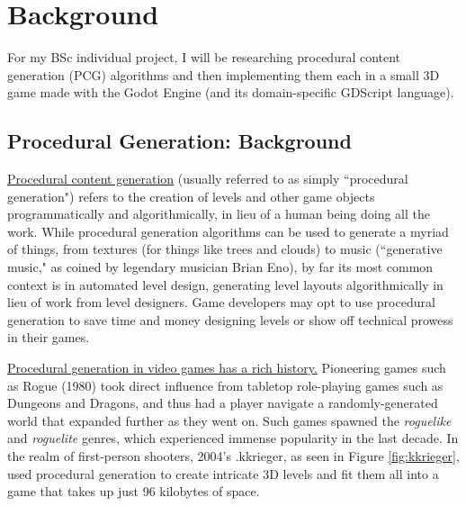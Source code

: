 \chapter{Background}

For my BSc individual project, I will be researching procedural content generation (PCG) algorithms and then implementing them each in a small 3D game made with the Godot Engine (and its domain-specific GDScript language).

\section{Procedural Generation: Background}

\href{https://en.wikipedia.org/wiki/Procedural_generation}{Procedural content generation} (usually referred to as simply ``procedural generation") refers to the creation of levels and other game objects programmatically and algorithmically, in lieu of a human being doing all the work. While procedural generation algorithms can be used to generate a myriad of things, from textures (for things like trees and clouds) to music (``generative music," as coined by legendary musician Brian Eno), by far its most common context is in automated level design, generating level layouts algorithmically in lieu of work from level designers. Game developers may opt to use procedural generation to save time and money designing levels or show off technical prowess in their games.

\href{https://en.wikipedia.org/wiki/Procedural\_generation#Video\_games}{Procedural generation in video games has a rich history.} Pioneering games such as Rogue (1980) took direct influence from tabletop role-playing games such as Dungeons and Dragons, and thus had a player navigate a randomly-generated world that expanded further as they went on. Such games spawned the \emph{roguelike} and \emph{roguelite} genres, which experienced immense popularity in the last decade. In the realm of first-person shooters, 2004's .kkrieger, as seen in Figure \ref{fig:kkrieger}, used procedural generation to create intricate 3D levels and fit them all into a game that takes up just 96 kilobytes of space. 

